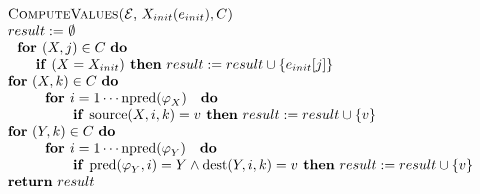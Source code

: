 \begin{equation*}
\begin{tabular}{l}
\textsc{ComputeValues(}$\mathcal{E}$, $X_{init}(e_{init}),C$\textsc{)} \\ 
$result:=$ $\emptyset $ \\ 
$\text{\textbf{for }}(X,j)\in C$ \textbf{do} \\ 
$\qquad $\textbf{if} $(X=X_{init})$\textbf{\ then} $result:=result\cup
\{e_{init}[j]\}$ \\ 
\textbf{for} $(X,k)\in C$ \textbf{do} \\ 
$\qquad \text{\textbf{for }}i=1\cdots \mathrm{npred}(\varphi _{X})\text{ 
\textbf{do}}$ \\ 
$\qquad \qquad \text{\textbf{if }}\mathrm{source}(X,i,k)=v$\textbf{\ then} $%
result:=result\cup \{v\}$ \\ 
\textbf{for} $(Y,k)\in C$ \textbf{do} \\ 
$\qquad \text{\textbf{for }}i=1\cdots \mathrm{npred}(\varphi _{Y})\text{ 
\textbf{do}}$ \\ 
$\qquad \qquad \text{\textbf{if }}\mathrm{pred}(\varphi _{Y},i)=Y\wedge 
\mathrm{dest}(Y,i,k)=v$\textbf{\ then} $result:=result\cup \{v\}$ \\ 
\textbf{return} $result$%
\end{tabular}%
\end{equation*}

